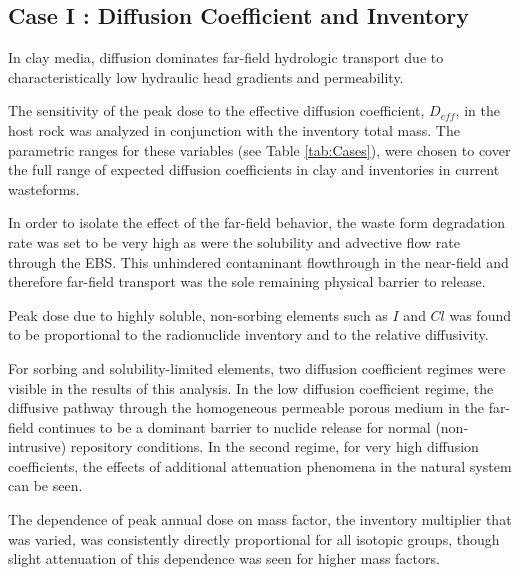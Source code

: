 
\subsection{Case I : Diffusion Coefficient and Inventory }
\label{sec:diffusivity}

In clay media, diffusion dominates far-field hydrologic transport due to 
characteristically low hydraulic head gradients and permeability. 

The sensitivity of the peak dose to the effective diffusion coefficient, 
$D_{eff}$, in the host rock was analyzed in conjunction with the inventory 
total mass. The parametric ranges for these variables (see Table 
\ref{tab:Cases}), were chosen to cover the full range of expected diffusion 
coefficients in clay and inventories in current wasteforms.

In order to isolate the effect of the far-field behavior, the waste form 
degradation rate was set to be very high as were the solubility and advective 
flow rate through the  \gls{EBS}. This unhindered contaminant flowthrough in the 
near-field and therefore far-field transport was the sole remaining physical 
barrier to release.

Peak dose due to highly soluble, non-sorbing elements such as $I$ and $Cl$ 
was found to be proportional to the radionuclide inventory and 
to the relative diffusivity. 

For sorbing and solubility-limited elements,
two diffusion coefficient regimes were visible in the results of this analysis. 
In the low diffusion coefficient regime, the diffusive pathway through the 
homogeneous permeable porous medium in the far-field continues to be a  dominant 
barrier to nuclide release for normal (non-intrusive) repository conditions.  
In the second regime, for very high diffusion coefficients, the effects of 
additional attenuation phenomena in the natural system can be seen. 

The dependence of peak annual dose on mass factor, the inventory multiplier that 
was varied, was consistently directly 
proportional for all isotopic groups, though slight attenuation of this 
dependence was seen for higher mass factors.
